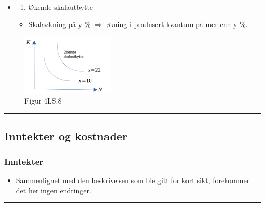 \documentclass[
  letterpaper,
  DIV=11,
  numbers=noendperiod]{scrartcl}
\providecommand{\tightlist}{%
  \setlength{\itemsep}{0pt}\setlength{\parskip}{0pt}}\usepackage{longtable,booktabs,array}
\begin{document}
\begin{itemize}
\item
  \begin{enumerate}
  \def\labelenumi{\roman{enumi})}
  \setcounter{enumi}{2}
  \tightlist
  \item
    Økende skalautbytte
  \end{enumerate}

  \begin{itemize}
  \tightlist
  \item
    Skalaøkning på y \% \(\Rightarrow\) økning i produsert kvantum på
    mer enn y \%.
  \end{itemize}
\end{itemize}

\begin{figure}[H]

{\centering \includegraphics[width=0.4\textwidth,height=\textheight]{drawio/okskala.png}

}

\caption{Figur 4LS.8}

\end{figure}%

\begin{center}\rule{0.5\linewidth}{0.5pt}\end{center}

\subsection{Inntekter og kostnader}\label{inntekter-og-kostnader-1}

\subsubsection{Inntekter}\label{inntekter-1}

\begin{itemize}
\tightlist
\item
  Sammenlignet med den beskrivelsen som ble gitt for kort sikt,
  forekommer det her ingen endringer.
\end{itemize}

\begin{center}\rule{0.5\linewidth}{0.5pt}\end{center}
\end{document}
